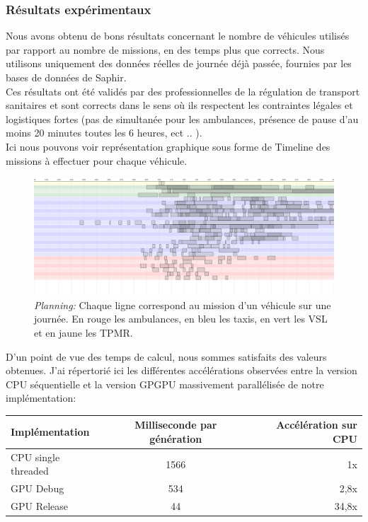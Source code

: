 \documentclass[french, 11pt]{memoir}
\begin{document}
\subsubsection{Résultats
expérimentaux}\label{ruxe9sultats-expuxe9rimentaux}

Nous avons obtenu de bons résultats concernant le nombre de véhicules
utilisés par rapport au nombre de missions, en des temps plus que
corrects. Nous utilisons uniquement des données réelles de journée déjà
passée, fournies par les bases de données de Saphir. \\
Ces résultats ont été validés par des professionnelles de la régulation
de transport sanitaires et sont corrects dans le sens où ils respectent
les contraintes légales et logistiques fortes (pas de simultanée pour
les ambulances, présence de pause d'au moins 20 minutes toutes les 6
heures, ect .. ). \\
Ici nous pouvons voir représentation graphique sous forme de Timeline
des missions à effectuer pour chaque véhicule.

\begin{figure}[htbp]
	\begin{center}
		\includegraphics[width=6in]{img/hirondelleTimeline.png}
		\caption{\textit{Planning:} Chaque ligne correspond au mission d'un véhicule sur une journée. En rouge les ambulances, en bleu les taxis, en vert les VSL et en jaune les TPMR.}
	\end{center}
\end{figure}

D'un point de vue des temps de calcul, nous sommes satisfaits des
valeurs obtenues. J'ai répertorié ici les différentes accélérations
observées entre la version CPU séquentielle et la version GPGPU
massivement parallélisée de notre implémentation:

\begin{center}
	\begin{tabular}{ |l| c| r|}
		\hline
Implémentation &Milliseconde par génération &Accélération sur CPU \\
\hline
CPU single threaded & 1566 &1x\\
\hline
GPU Debug&  534 & 2,8x \\
\hline
GPU Release& 44 & 34,8x \\
\hline
	\end{tabular}
\end{center}
\end{document}
